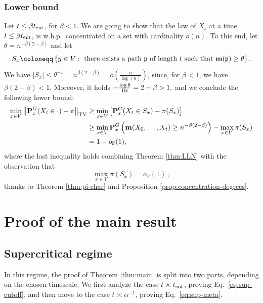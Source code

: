 \documentclass[11pt,oneside]{amsart}
\numberwithin{equation}{section}  %
\theoremstyle{plain}
\newcommand{\whp}{{w.h.p.~}}
\newcommand{\p}{\mathbb{P}}
\newcommand{\op}{o_{\p}}
\newcommand{\tv}[1]{\left\|#1\right\|_{\rm TV}}
\newcommand{\tent}{t_{\textup{ent}}}
\newcommand{\quenchG}{\mathbf{P}^G}
\newcommand{\entropy}{\textup{H}}
\newcommand{\mass}{\textup{\textbf{m}}}
\newcommand{\pat}{\mathfrak{p}}
\begin{document}
	\subsubsection{Lower bound} Let $t \le \beta \tent$, for $\beta<1$.
    We are going to show that the law of $X_t$ at a time $t \le {\beta\tent}$, is \whp concentrated on a set with cardinality $o(n)$. 
	To this end, let $\theta=n^{-\beta(2-\beta)}$ and let
	$$
	S_x\coloneqq \left\{y \in V : \text{ there exists a path $\pat$ of length $t$ such that } \mass(\pat)\ge \theta\right\}.
	$$
	We have $|S_x|\le \theta^{-1}=n^{\beta(2-\beta)}=o(\frac{n}{\log(n)})$, since, for $\beta<1$, we have $\beta(2-\beta)<1$. Moreover, it holds 
	$
	-\frac{\log \theta}{\entropy t}=2-\beta>1,
	$ and we conclude the following lower bound:
	\begin{equation} \label{eq:lower-bound}
		\begin{split}
			\min_{x \in V} \tv { \quenchG_x(X_t \in \cdot)-\pi} 
			& \ge \min_{x \in V} \left[\quenchG_x(X_t \in S_x)-\pi(S_x)\right]\\
			& \ge \min_{x \in V}\quenchG_x\left(\mass(X_0,\dots,X_t) \ge n^{-\beta(2-\beta)}\right)-\max_{x \in V}\pi(S_x)\\
			&=1-\op(1),
		\end{split}
	\end{equation}
	where the last inequality holds combining Theorem \ref{thm:LLN} with the observation that $$\max_{x \in V}\pi(S_x)=\op(1)\,,$$ thanks to Theorem \ref{thm:pi-char} and Proposition \ref{prop:concentration-degrees}.
	

\section{Proof of the main result }\label{sec:proof}
\subsection{Supercritical regime}
In this regime, the proof of Theorem \ref{thm:main} is split into two parts, depending on the chosen timescale. We first analyze the case $t \asymp \tent$, proving Eq.~\eqref{eq:sup-cutoff}, and then move to the case $t \asymp \alpha^{-1}$, proving Eq.~\eqref{eq:sup-meta}.
\end{document}
